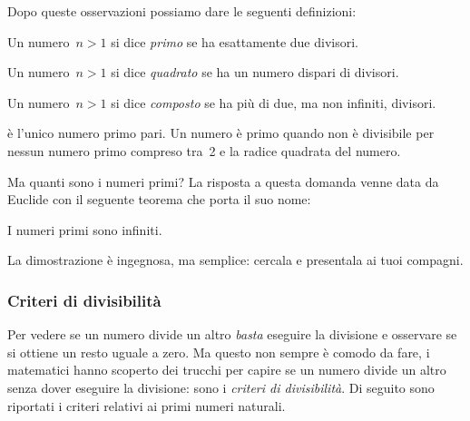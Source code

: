 Dopo queste osservazioni possiamo dare le seguenti definizioni:

\begin{definizione}
 Un numero~\(n>1\) si dice \emph{primo} se ha esattamente due divisori. 
\end{definizione}

\begin{definizione}
 Un numero~\(n>1\) si dice \emph{quadrato} se ha un numero dispari di 
divisori. 
\end{definizione}

\begin{definizione}
 Un numero~\(n>1\) si dice \emph{composto} se ha più di due, ma non infiniti, 
 divisori. 
\end{definizione}


 è l'unico numero primo pari.
\vspace{-1em}
\osservazione Un numero è primo quando non è divisibile per nessun numero 
primo compreso tra~2 e la radice quadrata del numero.

\vspace{1em}
Ma quanti sono i numeri primi? La risposta a questa domanda venne data da 
Euclide con il seguente teorema che porta il suo nome:

\begin{teorema}[di Euclide]
I numeri primi sono infiniti.
\end{teorema}

La dimostrazione è ingegnosa, ma semplice: cercala e presentala ai tuoi 
compagni.


\subsubsection{Criteri di divisibilità}
\label{subsec:nat_criteridivisibilita}

Per vedere se un numero divide un altro \emph{basta} eseguire la 
divisione e osservare se si ottiene un resto uguale a zero. 
Ma questo non sempre è comodo da fare, i matematici hanno scoperto dei
trucchi per capire se un numero divide un altro senza dover eseguire 
la divisione: sono i \emph{criteri di divisibilità}. 
Di seguito sono riportati i criteri relativi ai primi numeri naturali.

